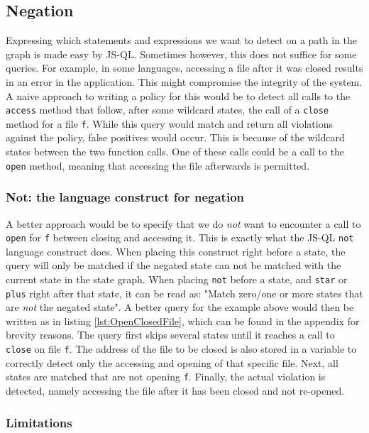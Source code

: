 \subsection{Negation}

Expressing which statements and expressions we want to detect on a path in the graph is made easy by JS-QL. Sometimes however, this does not suffice for some queries. For example, in some languages, accessing a file after it was closed results in an error in the application. This might compromise the integrity of the system. A naive approach to writing a policy for this would be to detect all calls to the \texttt{access} method that follow, after some wildcard states, the call of a \texttt{close} method for a file \texttt{f}. While this query would match and return all violations against the policy, false positives would occur. This is because of the wildcard states between the two function calls. One of these calls could be a call to the \texttt{open} method, meaning that accessing the file afterwards is permitted.  

\subsubsection*{Not: the language construct for negation}

A better approach would be to specify that we do \textit{not} want to encounter a call to \texttt{open} for \texttt{f} between closing and accessing it. This is exactly what the JS-QL \texttt{not} language construct does. When placing this construct right before a state, the query will only be matched if the negated state can not be matched with the current state in the state graph. When placing \texttt{not} before a state, and \texttt{star} or \texttt{plus} right after that state, it can be read as: "Match zero/one or more states that are \textit{not} the negated state". A better query for the example above would then be written as in listing \ref{lst:OpenClosedFile}, which can be found in the appendix for brevity reasons. The query first skips several states until it reaches a call to \texttt{close} on file \texttt{f}. The address of the file to be closed is also stored in a variable to correctly detect only the accessing and opening of that specific file. Next, all states are matched that are not opening \texttt{f}. Finally, the actual violation is detected, namely accessing the file after it has been closed and not re-opened. 

\subsubsection*{Limitations}

